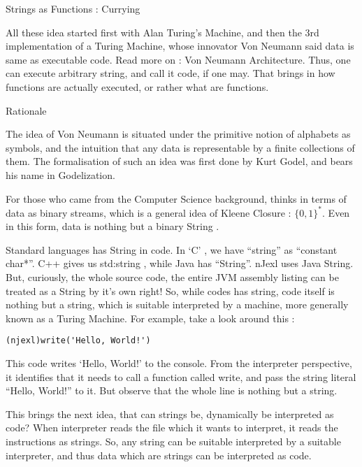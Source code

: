 \begin{section}{Strings as Functions : Currying}

All these idea started first with Alan Turing's Machine, and then the 3rd implementation of a Turing Machine, whose innovator Von Neumann said data is same as executable code. Read more on : Von Neumann Architecture.
Thus, one can execute arbitrary string, and call it code, if one may. That brings in how functions are actually executed, or rather what are functions.

\begin{subsection}{Rationale}

The idea of Von Neumann is situated under the primitive notion of alphabets as symbols, and the intuition that any data is representable by a finite collections of them. The formalisation of such an idea was first done by Kurt Godel, and bears his name in Godelization.

For those who came from the Computer Science background, thinks in terms of data as binary streams, which is a general idea of Kleene Closure : $\{0,1\}^*$. Even in this form, data is nothing but a binary String .

Standard languages has String in code. In `C' , we have ``string'' as ``constant char*''. C++ gives us std:string , 
while Java has ``String''. nJexl uses Java String. But, curiously, the whole source code, the entire JVM assembly listing can be treated as a String by it's own right! So, while codes has string, code itself is nothing but a string, which is suitable interpreted by a machine, more generally known as a Turing Machine. For example, take a look around this :

\begin{lstlisting}[style=all]
 (njexl)write('Hello, World!')
\end{lstlisting}

This code writes `Hello, World!' to the console. From the interpreter perspective, it identifies that it needs to call a function called write, and pass the string literal ``Hello, World!'' to it. But observe that the whole line is nothing but a string.

This brings the next idea, that can strings be, dynamically be interpreted as code? When interpreter reads the file which it wants to interpret, it reads the instructions as strings. So, any string can be suitable interpreted by a suitable interpreter, and thus data which are strings can be interpreted as code.

\end{subsection}


\end{section}
